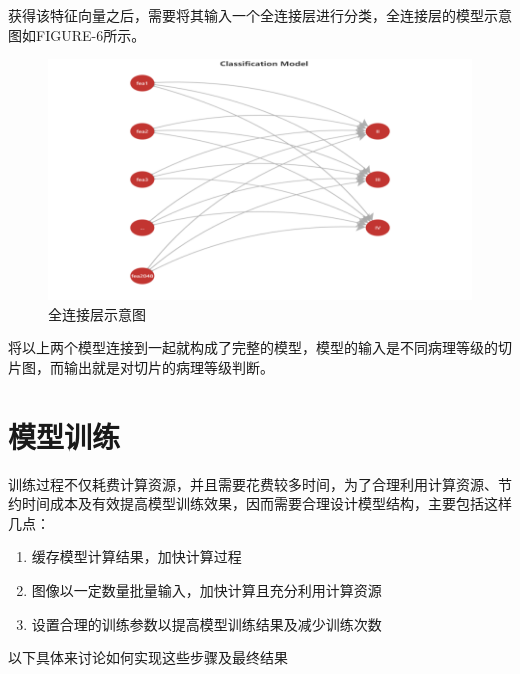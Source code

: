 \documentclass{ctexart}
\begin{document}
获得该特征向量之后，需要将其输入一个全连接层进行分类，全连接层的模型示意图如FIGURE-6所示。
\begin{figure}[!htbp] 
\centering
\includegraphics[width=\linewidth]{img/classify.png} 
\caption{全连接层示意图}
\label{f6} 
\end{figure}
将以上两个模型连接到一起就构成了完整的模型，模型的输入是不同病理等级的切片图，而输出就是对切片的病理等级判断。

\section{模型训练}
训练过程不仅耗费计算资源，并且需要花费较多时间，为了合理利用计算资源、节约时间成本及有效提高模型训练效果，因而需要合理设计模型结构，主要包括这样几点：
\begin{enumerate}
\item 缓存模型计算结果，加快计算过程
\item 图像以一定数量批量输入，加快计算且充分利用计算资源
\item 设置合理的训练参数以提高模型训练结果及减少训练次数
\end{enumerate}

以下具体来讨论如何实现这些步骤及最终结果
\end{document}
